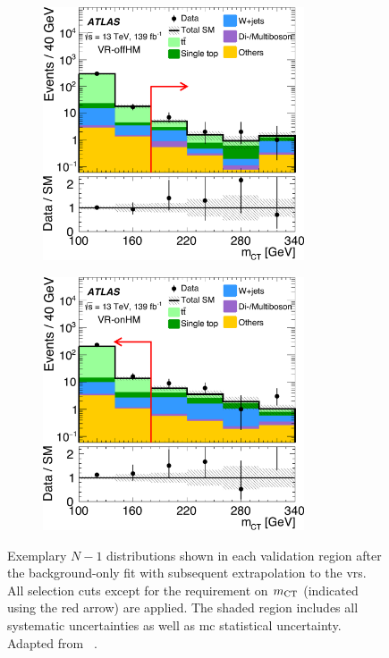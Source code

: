 \begin{figure}
	\begin{subfigure}[b]{0.5\linewidth}
		\centering\includegraphics[width=0.85\textwidth]{fig_03f_yellow}
	\end{subfigure}\hfill
	\begin{subfigure}[b]{0.5\linewidth}
		\centering\includegraphics[width=0.85\textwidth]{fig_03e_yellow}
	\end{subfigure}\hfill

	\caption{Exemplary $N-1$ distributions shown in each validation region after the background-only fit with subsequent extrapolation to the \glspl{vr}. All selection cuts except for the requirement on $m_{\textrm{CT}}$ (indicated using the red arrow) are applied. The shaded region includes all systematic uncertainties as well as \gls{mc} statistical uncertainty. Adapted from ~\cite{SUSY-2019-08}.}
	\label{fig:VR_distributions_postfit}
\end{figure}

